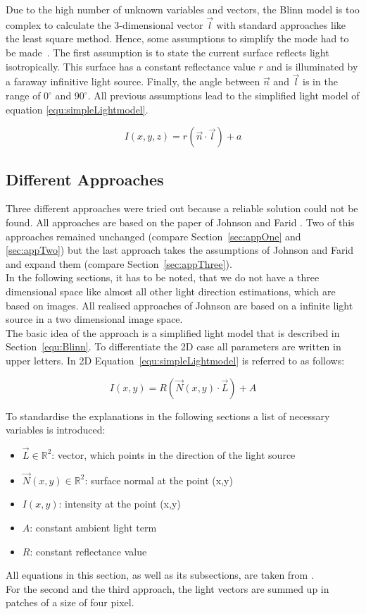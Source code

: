 Due to the high number of unknown variables and vectors, the Blinn model is too complex to calculate the 3-dimensional vector $\vec{l}$ with standard approaches like the least square method. Hence, some assumptions to simplify the mode had to be made~\cite{Johnson}. The first assumption is to state the current surface reflects light isotropically. This surface has a constant reflectance value $r$ and is illuminated by a faraway infinitive light source. Finally, the angle between $\vec{n}$ and  $\vec{l}$ is in the range of $0^\circ $ and $90^\circ$. All previous assumptions lead to the simplified light model of equation \ref{equ:simpleLightmodel}.

\begin{equation}
\label{equ:simpleLightmodel}
I(x,y,z) = r(\vec{n}\cdot \vec{l}) + a
\end{equation} 

\subsection{Different Approaches}\label{sec:approaches}
Three different approaches were tried out because a reliable solution could not be found. All approaches are based on the paper of Johnson and Farid \cite{Johnson}. 
Two of this approaches remained unchanged (compare Section~\ref{sec:appOne} and \ref{sec:appTwo}) but the last approach takes the assumptions of Johnson and Farid and expand them (compare Section~\ref{sec:appThree}). \\
In the following sections, it has to be noted, that we do not have a three dimensional space like almost all other light direction estimations, which are based on images. All realised approaches of Johnson are based on a infinite light source in a two dimensional image space. \\
The basic idea of the approach is a simplified light model that is described in Section~\ref{equ:Blinn}. To differentiate the 2D case all parameters are written in upper letters. In 2D Equation~\ref{equ:simpleLightmodel} is referred to as follows:

\begin{equation}
\label{equ:General}
I(x,y) = R(\vec{N}(x,y)\cdot \vec{L}) + A
\end{equation}

To standardise the explanations in the following sections a list of necessary variables is introduced: 
\begin{itemize}
\item $\vec{L} \in \mathbb{R}^2$: vector, which points in the direction of the light source 
\item $\vec{N}(x,y)\in \mathbb{R}^2$: surface normal at the point (x,y) 
\item $I(x,y)$: intensity at the point (x,y)
\item $A$: constant ambient light term
\item $R$: constant reflectance value
\end{itemize}
All equations in this section, as well as its subsections, are taken from \cite{Johnson}. \\
For the second and the third approach, the light vectors are summed up in patches of a size of four pixel. 

